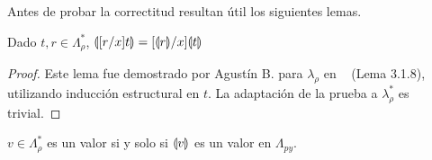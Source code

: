 Antes de probar la correctitud resultan útil los siguientes lemas.
\begin{lema}[Sustitución]
\label{lem:subst}
Dado $t, r \in \Lambda_\rho^*$, $\llparenthesis [r/x]t \rrparenthesis=[\llparenthesis r \rrparenthesis/x]\llparenthesis t \rrparenthesis$
\end{lema}
\begin{proof}
Este lema fue demostrado por Agustín B. para $\lambda_\rho$ en ~\cite{agustin} (Lema 3.1.8), utilizando inducción estructural en $t$. La adaptación de la prueba a $\lambda_\rho^*$ es trivial.
\end{proof}

\begin{lema}
\label{lem:valor}
$v \in \Lambda_\rho^*$ es un valor si y solo si $\llparenthesis v \rrparenthesis$ es un valor en $\Lambda_\textit{py}$.
\end{lema}
